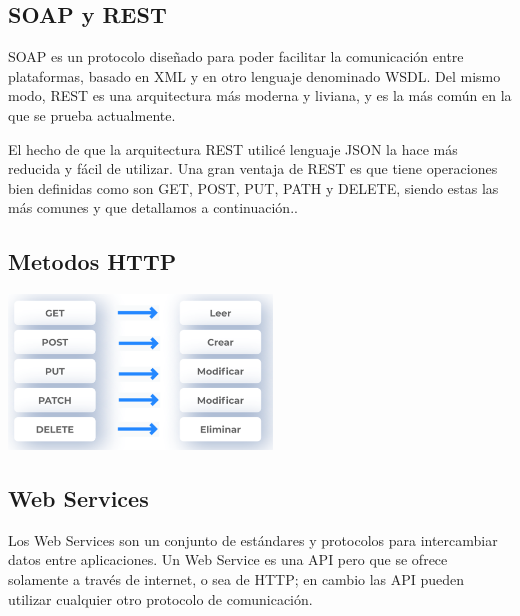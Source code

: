 \documentclass[twoside,twocolumn]{article}
\begin{document}
\subsection{SOAP y REST}
SOAP es un protocolo diseñado para poder facilitar la comunicación entre plataformas, basado en XML y en otro lenguaje denominado WSDL. Del mismo modo, REST es una arquitectura más moderna y liviana, y es la más común en la que se prueba actualmente.

El hecho de que la arquitectura REST utilicé lenguaje JSON la hace más reducida y fácil de utilizar. Una gran ventaja de REST es que tiene operaciones bien definidas como son GET, POST, PUT, PATH y DELETE, siendo estas las más comunes y que detallamos a continuación..
\subsection{Metodos HTTP}
\begin{center}
	\includegraphics[width=7cm]{./imagenes/metodos.png} 
	\end{center}
\subsection{Web Services}
Los Web Services son un conjunto de estándares y protocolos para intercambiar datos entre aplicaciones. Un Web Service es una API pero que se ofrece solamente a través de internet, o sea de HTTP; en cambio las API pueden utilizar cualquier otro protocolo de comunicación.
\end{document}
